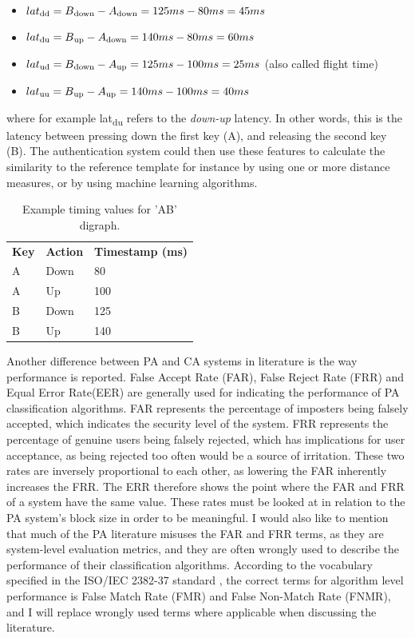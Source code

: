 \documentclass[informationsecurity]{gucmasterproject}
\begin{document}
\begin{itemize}
\item $lat\textsubscript{dd} = B\textsubscript{down}-A\textsubscript{down} = 125ms-80ms = 45ms$
\item $lat\textsubscript{du} = B\textsubscript{up}-A\textsubscript{down} = 140ms-80ms = 60ms$
\item $lat\textsubscript{ud} = B\textsubscript{down}-A\textsubscript{up} = 125ms-100ms=25ms$ (also called flight time)
\item $lat\textsubscript{uu} = B\textsubscript{up}-A\textsubscript{up} = 140ms-100ms=40ms$
\end{itemize}
where for example lat\textsubscript{du} refers to the \textit{down-up} latency.
In other words, this is the latency between pressing down the first key (A), and releasing the second key (B).
The authentication system could then use these features to calculate the similarity to the reference template for instance by using one or more distance measures, or by using machine learning algorithms.

\begin{table}[h]
    \centering
    \begin{tabular}{lll}
         \bf Key & \bf Action & \bf Timestamp (ms)\\
         A & Down & 80\\
         A & Up & 100\\
         B & Down & 125\\
         B & Up & 140
    \end{tabular}
    \caption{Example timing values for 'AB' digraph.}
    \label{tab:timing-example}
\end{table}

Another difference between PA and CA systems in literature is the way performance is reported.
False Accept Rate (FAR), False Reject Rate (FRR) and Equal Error Rate(EER) are generally used for indicating the performance of PA classification algorithms.
FAR represents the percentage of imposters being falsely accepted, which indicates the security level of the system. 
FRR represents the percentage of genuine users being falsely rejected, which has implications for user acceptance, as being rejected too often would be a source of irritation.
These two rates are inversely proportional to each other, as lowering the FAR inherently increases the FRR.
The ERR therefore shows the point where the FAR and FRR of a system have the same value.
These rates must be looked at in relation to the PA system's block size in order to be meaningful.
I would also like to mention that much of the PA literature misuses the FAR and FRR terms, as they are system-level evaluation metrics, and they are often wrongly used to describe the performance of their classification algorithms.
According to the vocabulary specified in the ISO/IEC 2382-37 standard \cite{ISO-voc}, the correct terms for algorithm level performance is False Match Rate (FMR) and False Non-Match Rate (FNMR), and I will replace wrongly used terms where applicable when discussing the literature.
\end{document}
